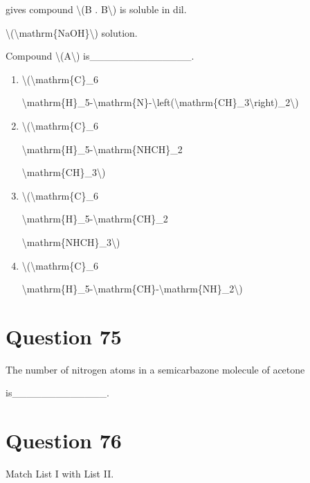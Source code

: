 \documentclass{article}
\begin{document}
gives compound \textbackslash(B . B\textbackslash) is soluble in dil.

\textbackslash(\textbackslash mathrm\{NaOH\}\textbackslash) solution.~



Compound \textbackslash(A\textbackslash) is\_\_\_\_\_\_\_\_\_\_\_\_\_\_.


\begin{enumerate}[label=(\alph*)]
\item \textbackslash(\textbackslash mathrm\{C\}\_6

\textbackslash mathrm\{H\}\_5-\textbackslash mathrm\{N\}-\textbackslash left(\textbackslash mathrm\{CH\}\_3\textbackslash right)\_2\textbackslash)


\item \textbackslash(\textbackslash mathrm\{C\}\_6

\textbackslash mathrm\{H\}\_5-\textbackslash mathrm\{NHCH\}\_2

\textbackslash mathrm\{CH\}\_3\textbackslash)


\item \textbackslash(\textbackslash mathrm\{C\}\_6

\textbackslash mathrm\{H\}\_5-\textbackslash mathrm\{CH\}\_2

\textbackslash mathrm\{NHCH\}\_3\textbackslash)


\item \textbackslash(\textbackslash mathrm\{C\}\_6

\textbackslash mathrm\{H\}\_5-\textbackslash mathrm\{CH\}-\textbackslash mathrm\{NH\}\_2\textbackslash)


\end{enumerate}
\newpage
\section*{Question 75}
The number of nitrogen atoms in a semicarbazone molecule of acetone

is\_\_\_\_\_\_\_\_\_\_\_\_\_.


\begin{enumerate}[label=(\alph*)]
\end{enumerate}
\newpage
\section*{Question 76}
Match List I with List II.
\end{document}
